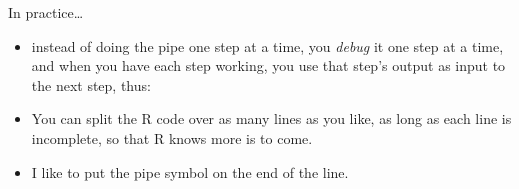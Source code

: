 \documentclass[
  ignorenonframetext,
]{beamer}
\newenvironment{Shaded}{\begin{snugshade}}{\end{snugshade}}
\newcommand{\DataTypeTok}[1]{\textcolor[rgb]{0.13,0.29,0.53}{#1}}
\newcommand{\DecValTok}[1]{\textcolor[rgb]{0.00,0.00,0.81}{#1}}
\newcommand{\KeywordTok}[1]{\textcolor[rgb]{0.13,0.29,0.53}{\textbf{#1}}}
\newcommand{\NormalTok}[1]{#1}
\newcommand{\OperatorTok}[1]{\textcolor[rgb]{0.81,0.36,0.00}{\textbf{#1}}}
\newcommand{\StringTok}[1]{\textcolor[rgb]{0.31,0.60,0.02}{#1}}
\providecommand{\tightlist}{%
  \setlength{\itemsep}{0pt}\setlength{\parskip}{0pt}}
\begin{document}
\begin{frame}[fragile]{In practice\ldots{}}
\protect\hypertarget{in-practice}{}

\begin{itemize}
\tightlist
\item
  instead of doing the pipe one step at a time, you \emph{debug} it one
  step at a time, and when you have each step working, you use that
  step's output as input to the next step, thus:
\end{itemize}

\begin{Shaded}
\end{Shaded}

\begin{itemize}
\tightlist
\item
  You can split the R code over as many lines as you like, as long as
  each line is incomplete, so that R knows more is to come.
\item
  I like to put the pipe symbol on the end of the line.
\end{itemize}

\end{frame}
\end{document}
